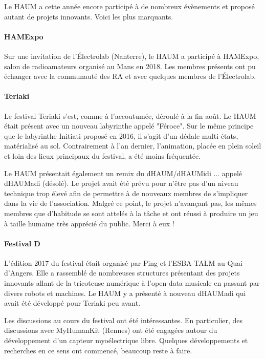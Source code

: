 \documentclass[11pt]{article}
\begin{document}
Le HAUM a cette année encore participé à de nombreux évènements et proposé autant de
projets innovants. Voici les plus marquants.

\paragraph{HAMExpo} Sur une invitation de l'Électrolab (Nanterre), le HAUM a participé à
HAMExpo, salon de radioamateurs organisé au Mans en 2018. Les membres présents ont pu
échanger avec la communauté des RA et avec quelques membres de l'Électrolab.

\paragraph{Teriaki} Le festival Teriaki s'est, comme à l'accoutumée, déroulé à la fin
août. Le HAUM était présent avec un nouveau labyrinthe appelé "Féroce". Sur le même
principe que le labyrinthe Initiati proposé en 2016, il s'agit d'un dédale multi-états,
matérialisé au sol. Contrairement à l'an dernier, l'animation, placée en plein soleil et
loin des lieux principaux du festival, a été moins fréquentée.

Le HAUM présentait également un remix du dHAUM/dHAUMidi ... appelé dHAUMadi (désolé). Le
projet avait été prévu pour n'être pas d'un niveau technique trop élevé afin de permettre
à de nouveaux membres de s'impliquer dans la vie de l'association.  Malgré ce point, le
projet n'avançant pas, les mêmes membres que d'habitude se sont attelés à la tâche et ont
réussi à produire un jeu à taille humaine très apprécié du public. Merci à eux !

\paragraph{Festival D} L'édition 2017 du festival était organisé par Ping et l'ESBA-TALM
au Quai d'Angers. Elle a rassemblé de nombreuses structures présentant des projets
innovants allant de la tricoteuse numérique à l'open-data musicale en passant par divers
robots et machines. Le HAUM y a présenté à nouveau dHAUMadi qui avait été développé pour
Teriaki peu avant.

Les discussions au cours du festival ont été intéressantes. En particulier, des
discussions avec MyHumanKit (Rennes) ont été engagées autour du développement d'un capteur
myoélectrique libre. Quelques développements et recherches en ce sens ont commencé,
beaucoup reste à faire.
\end{document}
